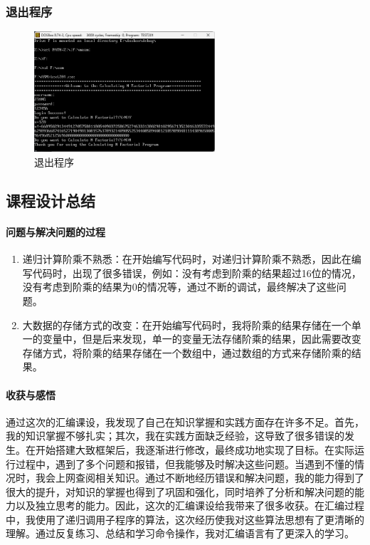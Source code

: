\documentclass[UTF8,12pt]{article}
\begin{document}
\subsubsection{退出程序}
\begin{figure}[htbp]
    \centering
    \includegraphics[width=0.6\textwidth]{img/13.png}
    \caption{退出程序}
\end{figure}

\newpage

\subsection{课程设计总结}
\paragraph{问题与解决问题的过程}
\begin{enumerate}
    \item 递归计算阶乘不熟悉：在开始编写代码时，对递归计算阶乘不熟悉，因此在编写代码时，出现了很多错误，例如：没有考虑到阶乘的结果超过16位的情况，没有考虑到阶乘的结果为0的情况等，通过不断的调试，最终解决了这些问题。
    \item 大数据的存储方式的改变：在开始编写代码时，我将阶乘的结果存储在一个单一的变量中，但是后来发现，单一的变量无法存储阶乘的结果，因此需要改变存储方式，将阶乘的结果存储在一个数组中，通过数组的方式来存储阶乘的结果。
\end{enumerate}

\paragraph{收获与感悟}
通过这次的汇编课设，我发现了自己在知识掌握和实践方面存在许多不足。首先，我的知识掌握不够扎实；其次，我在实践方面缺乏经验，这导致了很多错误的发生。在开始搭建大致框架后，我逐渐进行修改，最终成功地实现了目标。在实际运行过程中，遇到了多个问题和报错，但我能够及时解决这些问题。当遇到不懂的情况时，我会上网查阅相关知识。通过不断地经历错误和解决问题，我的能力得到了很大的提升，对知识的掌握也得到了巩固和强化，同时培养了分析和解决问题的能力以及独立思考的能力。因此，这次的汇编课设给我带来了很多收获。在汇编过程中，我使用了递归调用子程序的算法，这次经历使我对这些算法思想有了更清晰的理解。通过反复练习、总结和学习命令操作，我对汇编语言有了更深入的学习。
\end{document}
